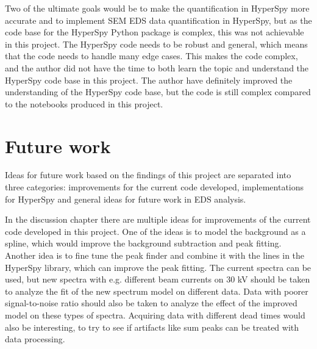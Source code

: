 Two of the ultimate goals would be to make the quantification in HyperSpy more accurate and to implement SEM EDS data quantification in HyperSpy, but as the code base for the HyperSpy Python package is complex, this was not achievable in this project.
The HyperSpy code needs to be robust and general, which means that the code needs to handle many edge cases.
This makes the code complex, and the author did not have the time to both learn the topic and understand the HyperSpy code base in this project.
The author have definitely improved the understanding of the HyperSpy code base, but the code is still complex compared to the notebooks produced in this project.















\section{Future work}
\label{sec:futurework}


Ideas for future work based on the findings of this project are separated into three categories: improvements for the current code developed, implementations for HyperSpy and general ideas for future work in EDS analysis.


In the discussion chapter there are multiple ideas for improvements of the current code developed in this project.
One of the ideas is to model the background as a spline, which would improve the background subtraction and peak fitting.
Another idea is to fine tune the peak finder and combine it with the lines in the HyperSpy library, which can improve the peak fitting.
The current spectra can be used, but new spectra with e.g. different beam currents on 30 kV should be taken to analyze the fit of the new spectrum model on different data.
Data with poorer signal-to-noise ratio should also be taken to analyze the effect of the improved model on these types of spectra.
Acquiring data with different dead times would also be interesting, to try to see if artifacts like sum peaks can be treated with data processing.



